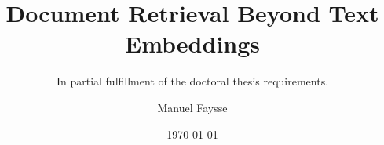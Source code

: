 \documentclass{kaobook}
\begin{document}

\titlehead{This document is a draft in progress.}

\title[Document Retrieval Beyond Text Embeddings]{Document Retrieval Beyond Text Embeddings}
\subtitle{In partial fulfillment of the doctoral thesis requirements.}

\author[Manuel Faysse]{Manuel Faysse}

\date{\today}

\publishers{Université Paris Saclay}


\frontmatter %





	
	
\end{document}

